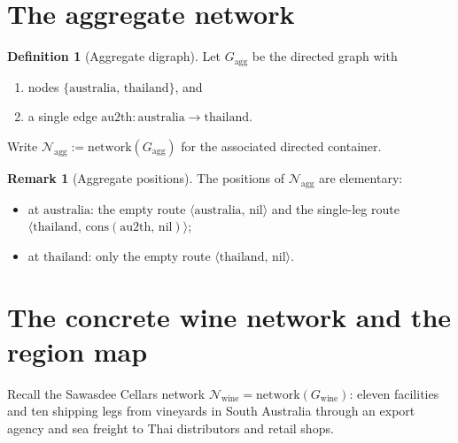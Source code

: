 \documentclass[11pt,a4paper]{article}
\theoremstyle{plain}
\theoremstyle{definition}
\newtheorem{definition}[theorem]{Definition}
\newtheorem{remark}[theorem]{Remark}
\begin{document}
\section{The aggregate network}

\begin{definition}[Aggregate digraph]\label{def:gagg}
Let $G_{\mathrm{agg}}$ be the directed graph with
\begin{enumerate}
  \item nodes $\{\mathrm{australia},\, \mathrm{thailand}\}$, and
  \item a single edge $\mathrm{au2th} : \mathrm{australia} \to
        \mathrm{thailand}$.
\end{enumerate}
Write $\mathcal{N}_{\mathrm{agg}} := \mathrm{network}(G_{\mathrm{agg}})$ for the
associated directed container.
\end{definition}

\begin{remark}[Aggregate positions]
The positions of $\mathcal{N}_{\mathrm{agg}}$ are elementary:
\begin{itemize}
  \item at $\mathrm{australia}$: the empty route
        $\langle\mathrm{australia},\, \mathrm{nil}\rangle$ and the single-leg
        route $\langle\mathrm{thailand},\, \mathrm{cons}(\mathrm{au2th},\,
        \mathrm{nil})\rangle$;
  \item at $\mathrm{thailand}$: only the empty route
        $\langle\mathrm{thailand},\, \mathrm{nil}\rangle$.
\end{itemize}
\end{remark}

\section{The concrete wine network and the region map}

Recall the Sawasdee Cellars network $\mathcal{N}_{\mathrm{wine}} =
\mathrm{network}(G_{\mathrm{wine}})$: eleven facilities and ten shipping legs
from vineyards in South Australia through an export agency and sea freight to
Thai distributors and retail shops.
\end{document}
